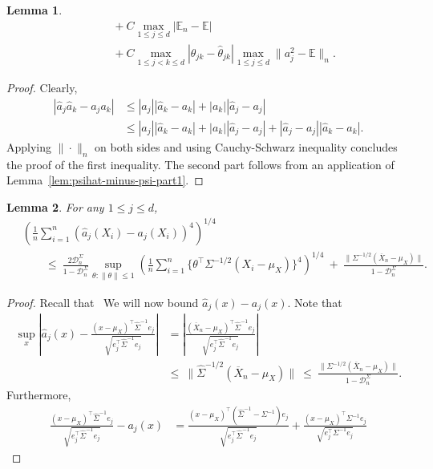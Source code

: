 \documentclass{article}
\newtheorem{lemma}{Lemma}
\begin{document}
\begin{appendices}
\begin{lemma}
\begin{align*}
 &\qquad+ C\max_{1\le j\le d}|\mathbb{E}_n - \mathbb{E}|\\
 &\qquad+ C\max_{1\le j < k\le d}|\theta_{jk} - \widehat{\theta}_{jk}|\max_{1\le j\le d}\|a_j^2 - \mathbb{E}\|_n.
 \end{align*}
 \end{lemma}
 \begin{proof}
 Clearly,
 \begin{align*}
 |\widehat{a}_j\widehat{a}_k - a_j a_k| &\le |\widehat{a}_j||\widehat{a}_k - a_k| + |a_k||\widehat{a}_j - a_j|\\
 &\le |a_j||\widehat{a}_k - a_k| + |a_k||\widehat{a}_j - a_j| + |\widehat{a}_j - a_j||\widehat{a}_k - a_k|.
 \end{align*}
 Applying $\|\cdot\|_n$ on both sides and using Cauchy-Schwarz inequality concludes the proof of the first inequality. The second part follows from an application of Lemma~\ref{lem:psihat-minus-psi-part1}. 
 \end{proof}
 \begin{lemma}\label{lem:ajhat-minus-aj}
 For any $1\le j\le d$,
 \begin{align*}
 &\left(\frac{1}{n}\sum_{i=1}^n (\widehat{a}_j(X_i) - a_j(X_i))^4\right)^{1/4}\\ ~&\qquad\le~ \frac{2\mathcal{D}_n^{\Sigma}}{1 - \mathcal{D}_n^{\Sigma}}\sup_{\theta:\|\theta\| \le 1}\left(\frac{1}{n}\sum_{i=1}^n{\{\theta^{\top}\Sigma^{-1/2}(X_i - \mu_X)\}^4}\right)^{1/4} ~+~ \frac{\|\Sigma^{-1/2}(\overline{X}_n - \mu_X)\|}{1 - \mathcal{D}_n^{\Sigma}}.
 \end{align*}
 \end{lemma}
 \begin{proof}
 Recall that
 \
 We will now bound $\widehat{a}_j(x) - a_j(x)$. Note that
 \begin{align*}
 \sup_{x}\left|\widehat{a}_j(x) - \frac{(x - \mu_{X})^{\top}\widehat{\Sigma}^{-1}e_j}{\sqrt{e_j^{\top}\widehat{\Sigma}^{-1}e_j}}\right| &= \left|\frac{(\overline{X}_n - \mu_X)^{\top}\widehat{\Sigma}^{-1}e_j}{\sqrt{e_j^{\top}\widehat{\Sigma}^{-1}e_j}}\right|\\ ~&\le~ \|\widehat{\Sigma}^{-1/2}(\overline{X}_n - \mu_X)\| ~\le~ \frac{\|\Sigma^{-1/2}(\overline{X}_n - \mu_X)\|}{1 - \mathcal{D}_n^{\Sigma}}. 
 \end{align*}
 Furthermore, 
 \begin{align*}
 \frac{(x - \mu_X)^{\top}\widehat{\Sigma}^{-1}e_j}{\sqrt{e_j^{\top}\widehat{\Sigma}^{-1}e_j}} - a_j(x) &= \frac{(x - \mu_X)^{\top}(\widehat{\Sigma}^{-1} - \Sigma^{-1})e_j}{\sqrt{e_j^{\top}\widehat{\Sigma}^{-1}e_j}} + \frac{(x - \mu_X)^{\top}\Sigma^{-1}e_j}{\sqrt{e_j^{\top}\Sigma^{-1}e_j}}\left.

\end{align*}
\end{proof}
\end{appendices}
\end{document}

